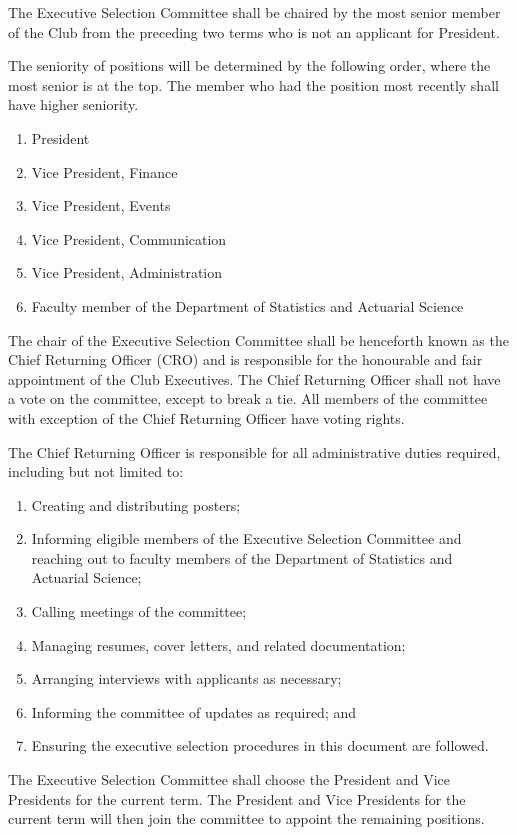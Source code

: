 \documentclass[11pt]{mathsoc}
\begin{document}
The Executive Selection Committee shall be chaired by the most senior member 
of the Club from the preceding two terms who is not an applicant for President.

The seniority of positions will be determined by the following order, where 
the most senior is at the top. The member who had the position most recently 
shall have higher seniority. 

\begin{enumerate}
    \item President
    \item Vice President, Finance
    \item Vice President, Events
    \item Vice President, Communication
    \item Vice President, Administration
    \item Faculty member of the Department of Statistics and Actuarial Science
\end{enumerate}

The chair of the Executive Selection Committee shall be henceforth known as the
Chief Returning Officer (CRO) and is responsible for the honourable and fair
appointment of the Club Executives. The Chief Returning Officer shall not have
a vote on the committee, except to break a tie. All members of the committee 
with exception of the Chief Returning Officer have voting rights.

The Chief Returning Officer is responsible for all administrative duties 
required, including but not limited to:
\begin{enumerate}
    \item Creating and distributing posters;
    \item Informing eligible members of the Executive Selection Committee and 
        reaching out to faculty members of the Department of Statistics and 
        Actuarial Science;
    \item Calling meetings of the committee;
    \item Managing resumes, cover letters, and related documentation;
    \item Arranging interviews with applicants as necessary;
    \item Informing the committee of updates as required; and
    \item Ensuring the executive selection procedures in this document are 
        followed.
\end{enumerate}

The Executive Selection Committee shall choose the President and Vice 
Presidents for the current term. The President and Vice Presidents for the 
current term will then join the committee to appoint the remaining positions.
\end{document}
